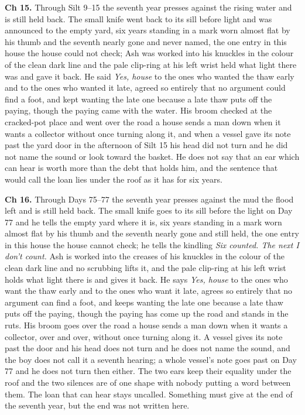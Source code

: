 \documentclass{design/chronicle}
\begin{document}
{\textbf{Ch 15.} Through Silt 9–15 the seventh year presses against the rising water and is still held back. The small knife went back to its sill before light and was announced to the empty yard, six years standing in a mark worn almost flat by his thumb and the seventh nearly gone and never named, the one entry in this house the house could not check; Ash was worked into his knuckles in the colour of the clean dark line and the pale clip-ring at his left wrist held what light there was and gave it back. He said \emph{Yes, house} to the ones who wanted the thaw early and to the ones who wanted it late, agreed so entirely that no argument could find a foot, and kept wanting the late one because a late thaw puts off the paying, though the paying came with the water. His broom checked at the cracked-pot place and went over the road a house sends a man down when it wants a collector without once turning along it, and when a vessel gave its note past the yard door in the afternoon of Silt 15 his head did not turn and he did not name the sound or look toward the basket. He does not say that an ear which can hear is worth more than the debt that holds him, and the sentence that would call the loan lies under the roof as it has for six years.

\textbf{Ch 16.} Through Days 75–77 the seventh year presses against the mud the flood left and is still held back. The small knife goes to its sill before the light on Day 77 and he tells the empty yard where it is, six years standing in a mark worn almost flat by his thumb and the seventh nearly gone and still held, the one entry in this house the house cannot check; he tells the kindling \emph{Six counted. The next I don’t count.} Ash is worked into the creases of his knuckles in the colour of the clean dark line and no scrubbing lifts it, and the pale clip-ring at his left wrist holds what light there is and gives it back. He says \emph{Yes, house} to the ones who want the thaw early and to the ones who want it late, agrees so entirely that no argument can find a foot, and keeps wanting the late one because a late thaw puts off the paying, though the paying has come up the road and stands in the ruts. His broom goes over the road a house sends a man down when it wants a collector, over and over, without once turning along it. A vessel gives its note past the door and his head does not turn and he does not name the sound, and the boy does not call it a seventh hearing; a whole vessel’s note goes past on Day 77 and he does not turn then either. The two ears keep their equality under the roof and the two silences are of one shape with nobody putting a word between them. The loan that can hear stays uncalled. Something must give at the end of the seventh year, but the end was not written here.

}
\end{document}
